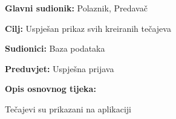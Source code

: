 				\noindent {}
				\begin{packed_item}
					
					\item \textbf{Glavni sudionik:} Polaznik, Predavač
					\item  \textbf{Cilj:} Uspješan prikaz svih kreiranih tečajeva
					\item  \textbf{Sudionici:} Baza podataka
					\item  \textbf{Preduvjet:} Uspješna prijava
					\item  \textbf{Opis osnovnog tijeka:}
					
					\item[] \begin{packed_enum}
						
						\item Tečajevi su prikazani na aplikaciji
						
					\end{packed_enum}
					
				\end{packed_item}
			
